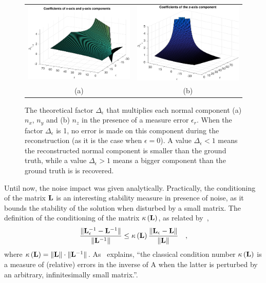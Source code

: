\documentclass{report}
\begin{document}
\begin{figure}
  \centering
  \begin{tabular}{cc}
  \includegraphics[width=0.45\linewidth]{q3_analytic_nx_ny.pdf} &
  \includegraphics[width=0.45\linewidth]{q3_analytic_nz.pdf} \\
  (a) & (b)
  \end{tabular}
  \caption[Analytical normal component coefficients]
   {The theoretical factor $\Delta_\epsilon$ that multiplies each normal component (a) $n_x$, $n_y$ and (b) $n_z$ in the presence of a measure error $\epsilon_r$. When the factor $\Delta_\epsilon$ is 1, no error is made on this component during the reconstruction (as it is the case when $\epsilon = 0$). A value $\Delta_\epsilon < 1$ means the reconstructed normal component is smaller than the ground truth, while a value $\Delta_\epsilon > 1$ means a bigger component than the ground truth is is recovered.}
  \label{q3:analytical}
\end{figure}

Until now, the noise impact was given analytically. Practically, the conditioning of the matrix $\mathbf{L}$ is an interesting stability measure in presence of noise, as it bounds the stability of the solution when disturbed by a small matrix. The definition of the conditioning of the matrix $\kappa \left(\mathbf{L}\right)$, as related by~\cite{ElGhaoui2002},
\begin{equation}
\frac{ \| \mathbf{L}_\epsilon ^{-1} - \mathbf{L}^{-1} \| }{ \| \mathbf{L}^{-1} \| }
\le \kappa\left(\mathbf{L} \right) \frac{ \| \mathbf{L}_\epsilon - \mathbf{L}  \| }{ \| \mathbf{L} \| }
\quad,
\end{equation}
where $\kappa \left(\mathbf{L}\right) = \|\mathbf{L}\| \cdot \|\mathbf{L}^{-1}\|$. As~\cite{ElGhaoui2002} explains, ``the classical condition number $\kappa \left(\mathbf{L}\right)$ is a measure of (relative) errors in the inverse of A when the latter is perturbed by an arbitrary, infinitesimally small matrix.''.
\end{document}
